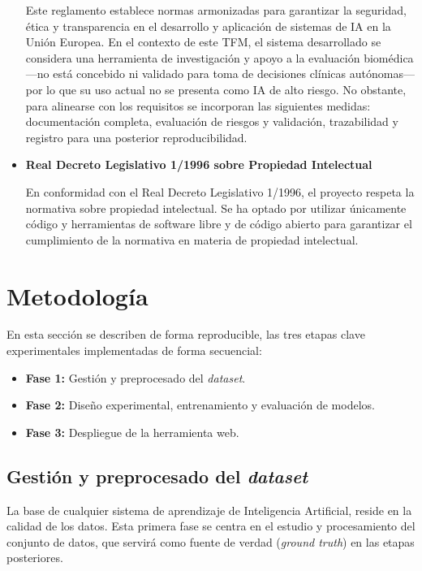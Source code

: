 \documentclass[12pt,a4paper,onecolumn,oneside]{report}
\begin{document}
\begin{itemize}
    Este reglamento establece normas armonizadas para garantizar la seguridad, ética y transparencia en el desarrollo y aplicación de sistemas de IA en la Unión Europea.  
    En el contexto de este TFM, el sistema desarrollado se considera una herramienta de investigación y apoyo a la evaluación biomédica —no está concebido ni validado para toma de decisiones clínicas autónomas— 
    por lo que su uso actual no se presenta como IA de alto riesgo. No obstante, para alinearse con los requisitos se incorporan las siguientes medidas: documentación completa, evaluación de riesgos y validación, 
    trazabilidad y registro para una posterior reproducibilidad.
    
    \item \textbf{Real Decreto Legislativo 1/1996 sobre Propiedad Intelectual}\cite{RDL1996}
    
    En conformidad con el Real Decreto Legislativo 1/1996, el proyecto respeta la normativa sobre propiedad intelectual. Se ha optado por utilizar 
    únicamente código y herramientas de software libre y de código abierto para garantizar el cumplimiento de la normativa en materia de propiedad 
    intelectual.

\end{itemize}


\chapter{Metodología} %
\label{metodologia}

En esta sección se describen de forma reproducible, las tres etapas clave experimentales implementadas de forma secuencial: 
\begin{itemize}
  \item \textbf{Fase 1:} Gestión y preprocesado del \textit{dataset}.
  \item \textbf{Fase 2:} Diseño experimental, entrenamiento y evaluación de modelos.
  \item \textbf{Fase 3:} Despliegue de la herramienta web.
\end{itemize}

\section{Gestión y preprocesado del \textit{dataset}}
\label{Gestión y preprocesado del dataset}

La base de cualquier sistema de aprendizaje de Inteligencia Artificial, reside en la calidad de los datos. Esta primera fase se centra en el estudio y procesamiento del conjunto de datos, que servirá como
fuente de verdad (\textit{ground truth}) en las etapas posteriores.
\end{document}
